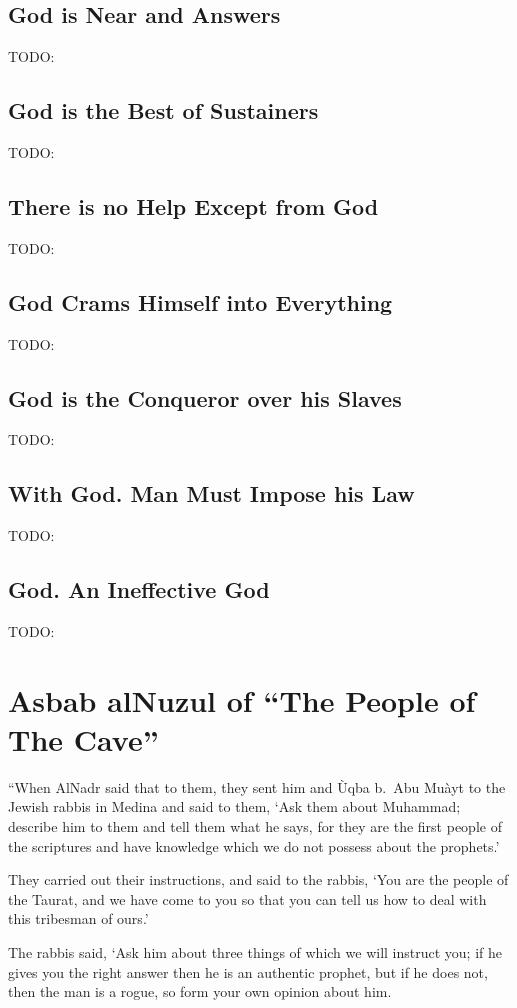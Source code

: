 \documentclass[12pt]{memoir}
\begin{document}
\section{God is Near and Answers}
TODO:
\section{God is the Best of Sustainers}
TODO:
\section{There is no Help Except from God}
TODO:
\section{God Crams Himself into Everything}
TODO:
\section{God is the Conqueror over his Slaves}
TODO:
\section{With God. Man Must Impose his Law}
TODO:
\section{God. An Ineffective God}
TODO:

\clearpage
\appendix
\addappheadtotoc

\chapter{Asbab al\–Nuzul of “The People of The Cave”}
\label{apdx:cave}

“When Al\–Nadr said that to them, they sent him and \`Uqba b.\ Abu Mu\`ayt
to the Jewish rabbis in Medina and said to them, ‘Ask them about Muhammad;
describe him to them and tell them what he says,
for they are the first people of the scriptures
and have knowledge which we do not possess about the prophets.’

They carried out their instructions, and said to the rabbis,
‘You are the people of the Taurat, and we have come to you
so that you can tell us how to deal with this tribesman of ours.’

The rabbis said, ‘Ask him about three things of which we will instruct you;
if he gives you the right answer then he is an authentic prophet,
but if he does not, then the man is a rogue,
so form your own opinion about him.
\end{document}
